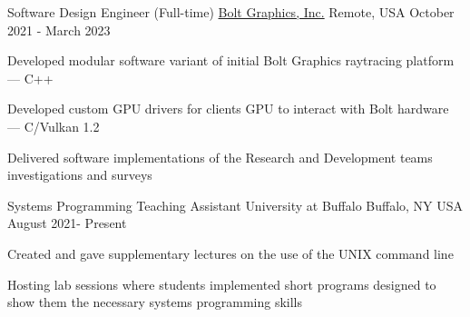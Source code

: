 

\begin{cventries}

  \cventry
    {Software Design Engineer (Full-time)} %
    {\href{https://www.bolt.graphics/}{Bolt Graphics, Inc.} } %
    {Remote, USA} %
    {October 2021 - March 2023} %
    {
      \begin{cvitems} %
        \item Developed modular software variant of initial Bolt Graphics raytracing platform --- C++
        \item Developed custom GPU drivers for clients GPU to interact with Bolt hardware --- C/Vulkan 1.2
        \item Delivered software implementations of the Research and Development teams investigations and surveys
      \end{cvitems}
    }
  \cventry
    {Systems Programming Teaching Assistant} %
    {University at Buffalo} %
    {Buffalo, NY USA} %
    {August 2021- Present} %
    {
      \begin{cvitems} %
        \item Created and gave supplementary lectures on the use of the UNIX command line
        \item Hosting lab sessions where students implemented short programs designed to show them the necessary systems programming skills
      \end{cvitems}
    }

\end{cventries}
